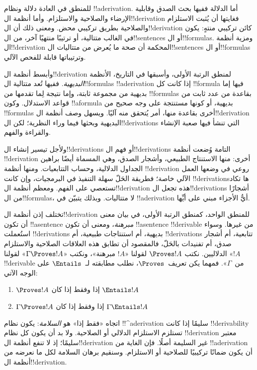 \documentclass[../../../include/open-logic-section]{subfiles}
\begin{document}
      {}
      {}


للمنطق في العادة دلالة ونظام !!a{derivation}. أما الدلالة ففيها بحث الصدق وقابلية الإرضاء والصلاحية والاستلزام. وأما أنظمة ال!!{derivation} فغايتها أن يُثبت الاستلزام والصلاحية بطريق تركيبي محض. ومعنى ذلك أن ال!!{derivation} كائن تركيبي منتهٍ: يكون في الغالب متتالية، أو ترتيبًا منتهيًا آخر، من ال!!{sentence}s أو ال!!{formula}s. ومزية أنظمة ال!!{derivation} المحكمة أن صحة ما يُعرض من متتاليات ال!!{sentence}s أو ال!!{formula}s وترتيباتها قابلة للفحص الآلي.

وأبسط أنظمة ال!!{derivation} لمنطق الرتبة الأولى، وأسبقها في التاريخ، الأنظمة \emph{البديهية}. ففيها تُعد متتالية ال!!{formula}s
!!a{derivation} إذا كانت كل !!{formula} فيها إما بديهية من مجموعة ثابتة، وإما نتيجة لِما تقدمها من !!{formula}s بقاعدة من عدد ثابت من قواعد الاستدلال. وكون
!!a{formula} بديهية، أو كونها مستنتجة على وجه صحيح من !!{formula}s أخرى بقاعدة منها، أمر يُتحقق منه آليًا. ويسهل وصف أنظمة ال!!{derivation} البديهية وبحثها فيما وراء النظرية؛ لكن ال!!{derivation}s التي تنشأ فيها صعبة الإنشاء والقراءة والفهم.

ولأجل تيسير إنشاء ال!!{derivation}s أو فهم ال!!{derivation}s التامة وُضعت أنظمة
!!{derivation} أخرى: منها الاستنتاج الطبيعي، وأشجار الصدق، وهي المسماة أيضًا براهين الجداول الدلالية، وحساب التتابعيات. ومنها أنظمة
!!{derivation} روعي في وضعها العمل الآلي خاصة؛ فطريقة الحَلّ سهلة التنفيذ في البرمجيات، وإن كانت !!{derivation}sها تكاد تستعصي على الفهم. ومعظم أنظمة ال!!{derivation} هذه تجعل ال!!{derivation}s أشجارًا من ال!!{formula}s، لا متتاليات. وبذلك يتبيّن في
!!a{derivation} أيُّ الأجزاء مبني على أيِّها.

تختلف إذن أنظمة ال!!{derivation} للمنطق الواحد، كمنطق الرتبة الأولى، في بيان معنى أن تكون
!!a{sentence} \emph{مبرهنة}، ومعنى أن تكون
!!a{sentence} !!{derivable} من غيرها. وسواء استُعملت
!!{derivation}s بديهية، أم استنتاجات طبيعية، أم
!!{derivation}s تتابعية، أم أشجار صدق، أم تفنيدات بالحَلّ، فالمقصود أن تطابق هذه العلاقات الصلاحية والاستلزام الدلاليين. نكتب
$\Proves !A$ لقولنا «$!A$ مبرهنة»، ونكتب
«$\Gamma \Proves !A$» لقولنا «$!A$ !!{derivable} من~$\Gamma$».
فمهما يكن تعريف~$\Proves$، نطلب مطابقته لـ~$\Entails$ على الوجه الآتي:
\begin{enumerate}
\item $\Proves !A$ إذا وفقط إذا كان $\Entails !A$
\item $\Gamma \Proves !A$ إذا وفقط إذا كان $\Gamma \Entails !A$
\end{enumerate}
اتجاه «فقط إذا» هو \emph{السلامة}: يكون نظام
!!^a{derivation} سليمًا إذا كانت !!{derivability} تستلزم الاستلزام الدلالي أو الصلاحية. ولا بد أن يكون كل نظام
!!{derivation} معتبر سليمًا؛ إذ لا تنفع أنظمة ال!!{derivation} غير السليمة أصلًا. فإن الغاية من
!!a{derivation} أن يكون ضمانًا تركيبيًا للصلاحية أو الاستلزام. وسنقيم برهان السلامة لكل ما نعرضه من أنظمة ال!!{derivation}.
\end{document}

